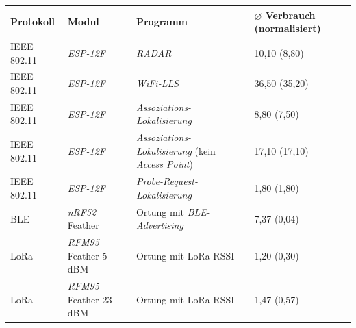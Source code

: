 \documentclass[18pt]{beamer}
\begin{document}
\begin{frame}
	\begin{tabular}{l|p{3cm}|p{3.1cm}|R{2.1cm}}
		Protokoll & Modul & Programm  & $\varnothing$ Verbrauch (normalisiert)\\
		\hline
		IEEE 802.11 & \emph{ESP-12F} & \emph{RADAR} & 10,10 (8,80) \\
		\hline
		IEEE 802.11 & \emph{ESP-12F} & \emph{WiFi-LLS} & 36,50 (35,20)\\
		\hline
		IEEE 802.11 & \emph{ESP-12F} & \emph{Assoziations-Lokalisierung} & 8,80 (7,50)\\
		IEEE 802.11 & \emph{ESP-12F} & \emph{Assoziations-Lokalisierung} (kein \emph{Access Point}) & 17,10 (17,10)\\
		\hline
		IEEE 802.11 & \emph{ESP-12F} & \emph{Probe-Request-Lokalisierung} & 1,80 (1,80)\\
		\hline
		BLE & \emph{nRF52} Feather & Ortung mit \emph{BLE-Advertising} & 7,37 (0,04)\\
		\hline
		LoRa & \emph{RFM95} Feather 5 dBM & Ortung mit LoRa RSSI & 1,20 (0,30)\\
		LoRa & \emph{RFM95} Feather 23 dBM & Ortung mit LoRa RSSI & 1,47 (0,57)\\
	\end{tabular}
\end{frame}
\end{document}
